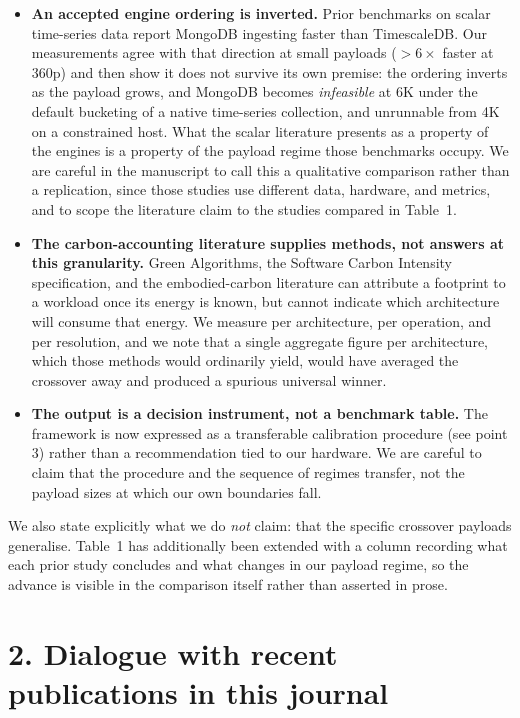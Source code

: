 \documentclass[11pt,a4paper]{article}
\begin{document}
\begin{itemize}
  \item \textbf{An accepted engine ordering is inverted.} Prior benchmarks on scalar time-series data
  report MongoDB ingesting faster than TimescaleDB. Our measurements agree with that direction at
  small payloads ($>6\times$ faster at 360p) and then show it does not survive its own premise: the
  ordering inverts as the payload grows, and MongoDB becomes \emph{infeasible} at 6K under the
  default bucketing of a native time-series collection, and unrunnable from 4K on a constrained
  host. What the scalar literature presents as a property of the engines is a property of the
  payload regime those benchmarks occupy. We are careful in the manuscript to call this a
  qualitative comparison rather than a replication, since those studies use different data,
  hardware, and metrics, and to scope the literature claim to the studies compared in Table~1.
  \item \textbf{The carbon-accounting literature supplies methods, not answers at this granularity.}
  Green Algorithms, the Software Carbon Intensity specification, and the embodied-carbon literature
  can attribute a footprint to a workload once its energy is known, but cannot indicate which
  architecture will consume that energy. We measure per architecture, per operation, and per
  resolution, and we note that a single aggregate figure per architecture, which those methods
  would ordinarily yield, would have averaged the crossover away and produced a spurious universal
  winner.
  \item \textbf{The output is a decision instrument, not a benchmark table.} The framework is now
  expressed as a transferable calibration procedure (see point 3) rather than a recommendation tied to
  our hardware. We are careful to claim that the procedure and the sequence of regimes transfer, not
  the payload sizes at which our own boundaries fall.
\end{itemize}

We also state explicitly what we do \emph{not} claim: that the specific crossover payloads
generalise. Table~1 has additionally been extended with a column recording what each prior study
concludes and what changes in our payload regime, so the advance is visible in the comparison itself
rather than asserted in prose.

\section*{2. Dialogue with recent publications in this journal}
\end{document}
